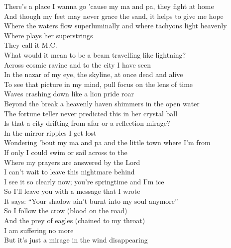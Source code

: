 \label{album:flight-b741}



There's a place I wanna go 'cause my ma and pa, they fight at home \\
And though my feet may never grace the sand, it helps to give me hope \\
Where the waters flow superluminally and where tachyons light heavenly \\
Where  plays her superstrings \\
They call it M.C. \\

What would it mean to be a beam travelling like lightning? \\
Across cosmic ravine and to the city I have seen \\
In the nazar of my eye, the skyline, at once dead and alive \\
To see that picture in my mind, pull focus on the lens of time \\

Waves crashing down like a lion pride roar \\
Beyond the break a heavenly haven shimmers in the open water \\
The fortune teller never predicted this in her crystal ball \\
Is that a city drifting from afar or a reflection mirage? \\

In the mirror ripples I get lost \\
Wondering 'bout my ma and pa and the little town where I'm from \\
If only I could swim or sail across to the  \\
Where my prayers are answered by the Lord \\

I can't wait to leave this nightmare behind \\
I see it so clearly now; you're springtime and I'm ice \\
So I'll leave you with a message that I wrote \\
It says: ``Your shadow ain't burnt into my soul anymore'' \\

So I follow the crow (blood on the road) \\
And the prey of eagles (chained to my throat) \\
I am suffering no more \\
But it's just a mirage in the wind disappearing \\

